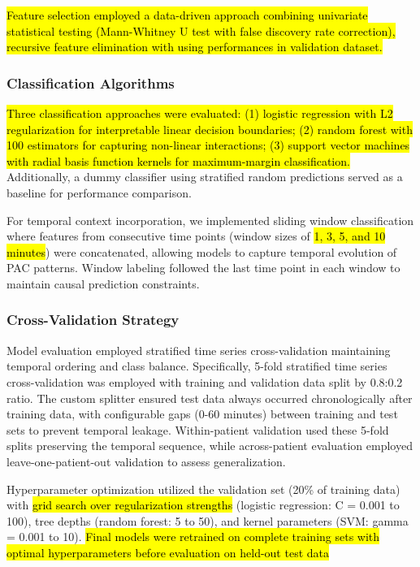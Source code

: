 	\hl{Feature selection employed a data-driven approach combining univariate statistical testing (Mann-Whitney U test with false discovery rate correction), recursive feature elimination with using performances in validation dataset.}

\subsubsection{Classification Algorithms}
\hl{Three classification approaches were evaluated: (1) logistic regression with L2 regularization for interpretable linear decision boundaries; (2) random forest with 100 estimators for capturing non-linear interactions; (3) support vector machines with radial basis function kernels for maximum-margin classification.} Additionally, a dummy classifier using stratified random predictions served as a baseline for performance comparison.

	For temporal context incorporation, we implemented sliding window classification where features from consecutive time points (window sizes of \hl{1, 3, 5, and 10 minutes}) were concatenated, allowing models to capture temporal evolution of PAC patterns. Window labeling followed the last time point in each window to maintain causal prediction constraints.

\subsubsection{Cross-Validation Strategy}
Model evaluation employed stratified time series cross-validation maintaining temporal ordering and class balance. Specifically, 5-fold stratified time series cross-validation was employed with training and validation data split by 0.8:0.2 ratio. The custom splitter ensured test data always occurred chronologically after training data, with configurable gaps (0-60 minutes) between training and test sets to prevent temporal leakage. Within-patient validation used these 5-fold splits preserving the temporal sequence, while across-patient evaluation employed leave-one-patient-out validation to assess generalization.

	Hyperparameter optimization utilized the validation set (20\% of training data) with \hl{grid search over regularization strengths} (logistic regression: C = 0.001 to 100), tree depths (random forest: 5 to 50), and kernel parameters (SVM: gamma = 0.001 to 10). \hl{Final models were retrained on complete training sets with optimal hyperparameters before evaluation on held-out test data}

